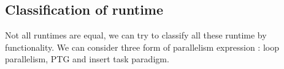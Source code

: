 \subsection{Classification of runtime}
Not all runtimes are equal, we can try to classify all these runtime by functionality.
%
We can consider three form of parallelism expression : loop parallelism, PTG and insert task paradigm.
%







